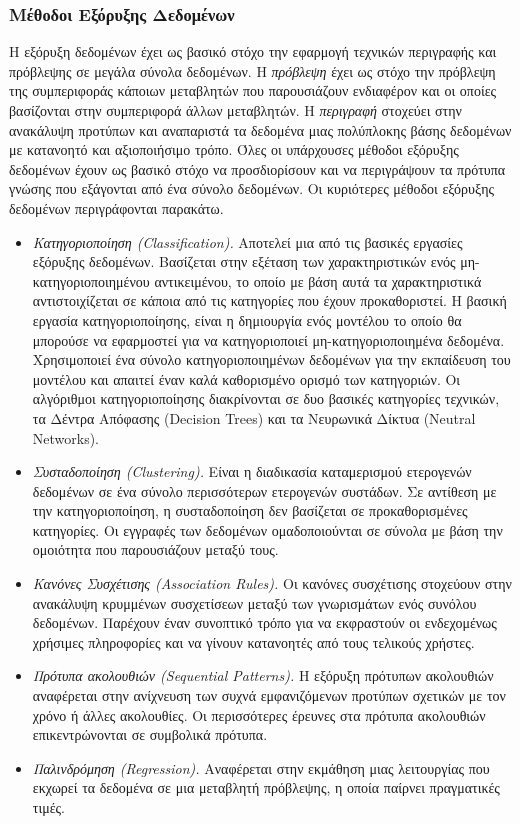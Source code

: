 \documentclass[12pt,twoside,openright]{report}
\begin{document}
\subsubsection{Μέθοδοι Εξόρυξης Δεδομένων}
Η εξόρυξη δεδομένων έχει ως βασικό στόχο την εφαρμογή τεχνικών περιγραφής και πρόβλεψης σε μεγάλα σύνολα δεδομένων. Η \emph{πρόβλεψη} έχει ως στόχο την πρόβλεψη της συμπεριφοράς κάποιων μεταβλητών που παρουσιάζουν ενδιαφέρον και οι οποίες βασίζονται στην συμπεριφορά άλλων μεταβλητών. Η \emph{περιγραφή} στοχεύει στην ανακάλυψη προτύπων και αναπαριστά τα δεδομένα μιας πολύπλοκης βάσης δεδομένων με κατανοητό και αξιοποιήσιμο τρόπο. Όλες οι υπάρχουσες μέθοδοι εξόρυξης δεδομένων έχουν ως βασικό στόχο να προσδιορίσουν και να περιγράψουν τα πρότυπα γνώσης που εξάγονται από ένα σύνολο δεδομένων. Οι κυριότερες μέθοδοι εξόρυξης δεδομένων περιγράφονται παρακάτω.
\begin{itemize}
 \item \emph{Κατηγοριοποίηση (\lt Classification).\gt} Αποτελεί μια από τις βασικές εργασίες εξόρυξης δεδομένων. Βασίζεται στην εξέταση των χαρακτηριστικών ενός μη-κατηγοριοποιημένου αντικειμένου, το οποίο με βάση αυτά τα χαρακτηριστικά αντιστοιχίζεται σε κάποια από τις κατηγορίες που έχουν προκαθοριστεί. Η βασική εργασία κατηγοριοποίησης, είναι η δημιουργία ενός μοντέλου το οποίο θα μπορούσε να εφαρμοστεί για να κατηγοριοποιεί μη-κατηγοριοποιημένα δεδομένα. Χρησιμοποιεί ένα σύνολο κατηγοριοποιημένων δεδομένων για την εκπαίδευση του μοντέλου και απαιτεί έναν καλά καθορισμένο ορισμό των κατηγοριών. Οι αλγόριθμοι κατηγοριοποίησης διακρίνονται σε δυο βασικές κατηγορίες τεχνικών, τα Δέντρα Απόφασης (\lt Decision Trees) \gt και τα Νευρωνικά Δίκτυα (\lt Neutral Networks)\gt.
 \item \emph{Συσταδοποίηση (\lt Clustering).\gt} Είναι η διαδικασία καταμερισμού ετερογενών δεδομένων σε ένα σύνολο περισσότερων ετερογενών συστάδων. Σε αντίθεση με την κατηγοριοποίηση, η συσταδοποίηση δεν βασίζεται σε προκαθορισμένες κατηγορίες. Οι εγγραφές των δεδομένων ομαδοποιούνται σε σύνολα με βάση την ομοιότητα που παρουσιάζουν μεταξύ τους.
\item \emph{Κανόνες Συσχέτισης (\lt Association Rules).\gt} Οι κανόνες συσχέτισης στοχεύουν στην ανακάλυψη κρυμμένων συσχετίσεων μεταξύ των γνωρισμάτων ενός συνόλου δεδομένων. Παρέχουν έναν συνοπτικό τρόπο για να εκφραστούν οι ενδεχομένως χρήσιμες πληροφορίες και να γίνουν κατανοητές από τους τελικούς χρήστες.
\item \emph{Πρότυπα ακολουθιών (\lt Sequential Patterns).\gt} Η εξόρυξη πρότυπων ακολουθιών αναφέρεται στην ανίχνευση των συχνά εμφανιζόμενων προτύπων σχετικών με τον χρόνο ή άλλες ακολουθίες. Οι περισσότερες έρευνες στα πρότυπα ακολουθιών επικεντρώνονται σε συμβολικά πρότυπα. 
\item \emph{Παλινδρόμηση (\lt Regression).\gt} Αναφέρεται στην εκμάθηση μιας λειτουργίας που εκχωρεί τα δεδομένα σε μια μεταβλητή πρόβλεψης, η οποία παίρνει πραγματικές τιμές.
\end{itemize}
\end{document}
